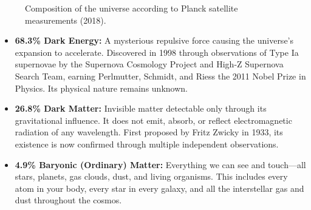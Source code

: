 \documentclass[11pt,a4paper]{article}
\begin{document}
\begin{figure}[H]
    \centering
    \caption{Composition of the universe according to Planck satellite measurements (2018).}
    \label{fig:universe_composition}
\end{figure}

\begin{itemize}[noitemsep]
    \item \textbf{68.3\% Dark Energy:} A mysterious repulsive force causing the universe's expansion to accelerate. Discovered in 1998 through observations of Type Ia supernovae by the Supernova Cosmology Project and High-Z Supernova Search Team, earning Perlmutter, Schmidt, and Riess the 2011 Nobel Prize in Physics. Its physical nature remains unknown.

    \item \textbf{26.8\% Dark Matter:} Invisible matter detectable only through its gravitational influence. It does not emit, absorb, or reflect electromagnetic radiation of any wavelength. First proposed by Fritz Zwicky in 1933, its existence is now confirmed through multiple independent observations.

    \item \textbf{4.9\% Baryonic (Ordinary) Matter:} Everything we can see and touch---all stars, planets, gas clouds, dust, and living organisms. This includes every atom in your body, every star in every galaxy, and all the interstellar gas and dust throughout the cosmos.
\end{itemize}
\end{document}
